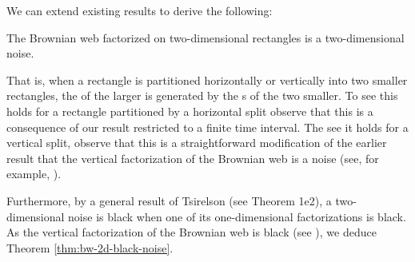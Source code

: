 {We can extend existing results to derive the following:

\begin{proposition*}
The Brownian web factorized on two-dimensional
rectangles is a two-dimensional noise.
\end{proposition*}

That is, when a rectangle is partitioned horizontally or vertically
into two smaller rectangles, the \sigfield{} of the larger is
generated by the \sigfield{}s of the two smaller.  To see this holds
for a rectangle partitioned by a horizontal split observe that this is
a consequence of our result restricted to a finite time interval.  The
see it holds  for a vertical split, observe that this is a
straightforward modification of the earlier result that the vertical
factorization of the Brownian web is a noise (see, for example,
\cite{tsirelson-scaling-limit-noise-stability}).

Furthermore, by a general result
of Tsirelson (see
\cite{tsirelson-noise-as-a-boolean-algebra} Theorem 1e2),
a two-dimensional noise is black when
one of its one-dimensional factorizations is
black. As the vertical factorization of
the Brownian web is black (see
\cite{tsirelson-nonclassical-stochastic-flows}),
we deduce Theorem \ref{thm:bw-2d-black-noise}.
}
